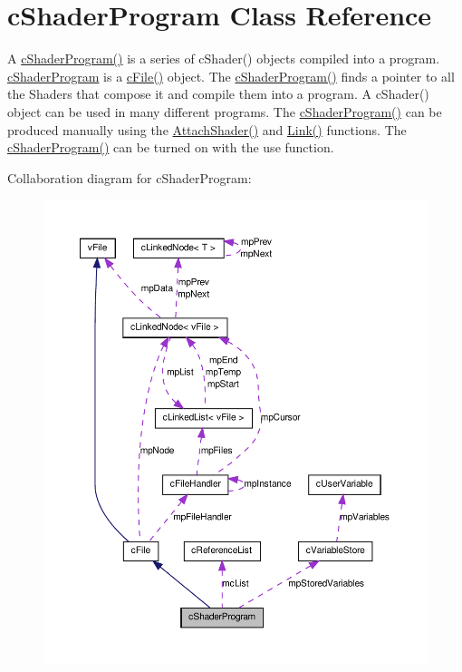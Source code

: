 \hypertarget{classc_shader_program}{
\section{cShaderProgram Class Reference}
\label{classc_shader_program}
}


A \hyperlink{classc_shader_program_ab032906ae85885362543784fea60cc87}{cShaderProgram()} is a series of cShader() objects compiled into a program. \hyperlink{classc_shader_program}{cShaderProgram} is a \hyperlink{classc_file_a5bb81f36e954af61b581e3c1fd06e0de}{cFile()} object. The \hyperlink{classc_shader_program_ab032906ae85885362543784fea60cc87}{cShaderProgram()} finds a pointer to all the Shaders that compose it and compile them into a program. A cShader() object can be used in many different programs. The \hyperlink{classc_shader_program_ab032906ae85885362543784fea60cc87}{cShaderProgram()} can be produced manually using the \hyperlink{classc_shader_program_a0f0adf11f436c0d8149b6c5e196fe859}{AttachShader()} and \hyperlink{classc_shader_program_a2e6bc46c158959bcea66b4e321416b72}{Link()} functions. The \hyperlink{classc_shader_program_ab032906ae85885362543784fea60cc87}{cShaderProgram()} can be turned on with the use function.  




Collaboration diagram for cShaderProgram:\nopagebreak
\begin{figure}[H]
\begin{center}
\leavevmode
\includegraphics[width=400pt]{classc_shader_program__coll__graph}
\end{center}
\end{figure}
